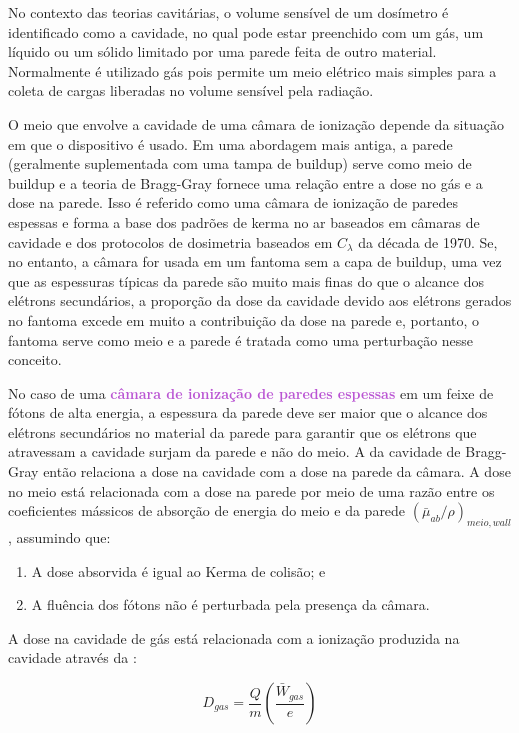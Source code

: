 \documentclass[11pt,a4paper]{article}
\begin{document}
			No contexto das teorias cavitárias, o volume sensível de um dosímetro é identificado como a cavidade, no qual pode estar preenchido com um gás, um líquido ou um sólido limitado por uma parede feita de outro material. Normalmente é utilizado gás pois permite um meio elétrico mais simples para a coleta de cargas liberadas no volume sensível pela radiação. 

			O meio que envolve a cavidade de uma câmara de ionização depende da situação em que o dispositivo é usado. Em uma abordagem mais antiga, a parede (geralmente suplementada com uma tampa de buildup) serve como meio de buildup e a teoria de Bragg-Gray fornece uma relação entre a dose no gás e a dose na parede. Isso é referido como uma câmara de ionização de paredes espessas e forma a base dos padrões de kerma no ar baseados em câmaras de cavidade e dos protocolos de dosimetria baseados em $C_\lambda$ da década de 1970. Se, no entanto, a câmara for usada em um fantoma sem a capa de buildup, uma vez que as espessuras típicas da parede são muito mais finas do que o alcance dos elétrons secundários, a proporção da dose da cavidade devido aos elétrons gerados no fantoma excede em muito a contribuição da dose na parede e, portanto, o fantoma serve como meio e a parede é tratada como uma perturbação nesse conceito.

			No caso de uma \textbf{\textcolor{MediumOrchid}{câmara de ionização de paredes espessas}} em um feixe de fótons de alta energia, a espessura da parede deve ser maior que o alcance dos elétrons secundários no material da parede para garantir que os elétrons que atravessam a cavidade surjam da parede e não do meio. A   da cavidade de Bragg-Gray então relaciona a dose na cavidade com a dose na parede da câmara. A dose no meio está relacionada com a dose na parede por meio de uma razão entre os coeficientes mássicos de absorção de energia do meio e da parede $(\bar{\mu}_{ab}/\rho)_{meio, wall}$, assumindo que:

			\begin{enumerate}
				\item A dose absorvida é igual ao Kerma de colisão; e
				\item A fluência dos fótons não é perturbada pela presença da câmara.
			\end{enumerate}

			A dose na cavidade de gás está relacionada com a ionização produzida na cavidade através da  :

				\begin{equation}
					D_{gas} = \frac{Q}{m}\left(\frac{\bar{W}_{gas}}{e}\right)
				\end{equation}
\end{document}
